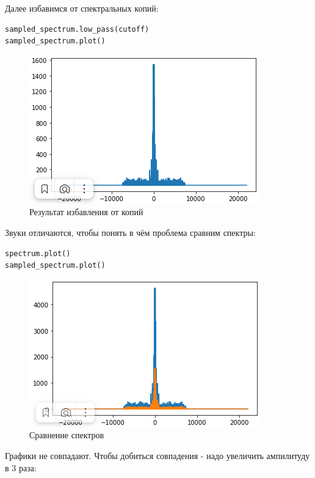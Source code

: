 Далее избавимся от спектральных копий:
\begin{lstlisting}[language=Python]
sampled_spectrum.low_pass(cutoff)
sampled_spectrum.plot()
\end{lstlisting}
\begin{figure}[H]
	\begin{center}
		\includegraphics[scale=1]{fig/lab11/lab11_5.png}
		\caption{Результат избавления от копий}
	\end{center}
\end{figure}

Звуки отличаются, чтобы понять в чём проблема сравним спектры:

\begin{lstlisting}[language=Python]
spectrum.plot()
sampled_spectrum.plot()
\end{lstlisting}
\begin{figure}[H]
	\begin{center}
		\includegraphics[scale=1]{fig/lab11/lab11_6.png}
		\caption{Сравнение спектров}
	\end{center}
\end{figure}

Графики не совпадают. Чтобы добиться совпадения - надо увеличить ампилитуду в 3 раза:

